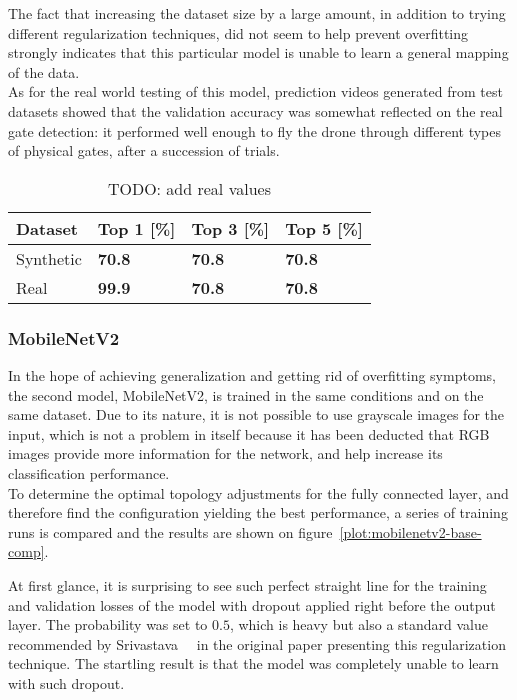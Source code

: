 The fact that increasing the dataset size by a large amount, in addition to
trying different regularization techniques, did not seem to help prevent
overfitting strongly indicates that this particular model is unable to
learn a general mapping of the data.\\

As for the real world testing of this model, prediction videos generated from
test datasets showed that the validation accuracy was somewhat reflected on the
real gate detection: it performed well enough to fly the drone through
different types of physical gates, after a succession of trials.\\

\begin{table}[!h]
    \centering
    \caption{TODO: add real values}
    \begin{tabular}{llll}
        \toprule
		Dataset & Top 1 [\%] & Top 3 [\%] & Top 5 [\%]\\
        \midrule         
		Synthetic & \textbf{70.8} & \textbf{70.8} & \textbf{70.8} \\ 
        Real & \textbf{99.9} & \textbf{70.8} & \textbf{70.8} \\
        \bottomrule
    \end{tabular}
    \label{tab:my_label}
\end{table}

\subsubsection{MobileNetV2}

In the hope of achieving generalization and getting rid of overfitting
symptoms, the second model, MobileNetV2, is trained in the same conditions and
on the same dataset. Due to its nature, it is not possible to use grayscale
images for the input, which is not a problem in itself because it has been
deducted that RGB images provide more information for the network, and help
increase its classification performance.\\

To determine the optimal topology adjustments for the fully connected layer,
and therefore find the configuration yielding the best performance, a series of
training runs is compared and the results are shown on
figure~\ref{plot:mobilenetv2-base-comp}.



At first glance, it is surprising to see such perfect straight line for the
training and validation losses of the model with dropout applied right before
the output layer. The probability was set to $0.5$, which is heavy but also a
standard value recommended by Srivastava~\etal~\cite{Dropout} in the original
paper presenting this regularization technique. The startling result is that
the model was completely unable to learn with such dropout.

